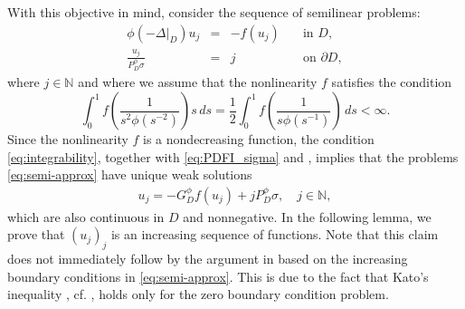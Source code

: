 \documentclass[12pt,a4paper,onecolumn]{amsart}
\theoremstyle{definition}
\newcommand{\N}{\mathbb{N}}
\newcommand{\1}{\mathbf 1}
\newcommand{\Lo}{\phi(-\left.\Delta\right\vert_{D})}
\newcommand{\GDfi}{G^\phi_{ D}}
\newcommand{\GDFI}{\GDfi}
\newcommand{\PDfi}{P^\phi_{ D}}
\newcommand{\PDFI}{\PDfi}
\numberwithin{equation}{section}
\begin{document}
With this objective in mind, consider the sequence of semilinear problems:
\begin{equation}\label{eq:semi-approx}
	\begin{array}{rcll}
		\Lo u_j&=& - f(u_j)& \quad \text{in } D,\\
		\frac{u_j}{\PDFI\sigma}&=&j&\quad \text{on }\partial D,
	\end{array}
\end{equation}
where $j\in \N$ and where we assume that the nonlinearity $f$ satisfies the condition 
\begin{equation}\label{eq:integrability}
    \int_0^1 f\left(\frac{1}{s^2\phi(s^{-2})}\right)s\, ds=\frac 1 2 \int_0^1 f\left(\frac{1}{s\phi(s^{-1})}\right)\, ds<\infty.
\end{equation}
Since the nonlinearity $f$ is a nondecreasing function, the condition \eqref{eq:integrability}, together with \eqref{eq:PDFI_sigma} and \cite[Theorem 5.10]{Bio23}, implies that the problems \eqref{eq:semi-approx} have unique weak solutions
\begin{align*}
	u_j=-\GDFI f(u_j)+j\PDFI\sigma,\quad j\in \N,
\end{align*}
which are also continuous in $D$ and nonnegative. In the following lemma, we prove that $(u_j)_j$ is an increasing sequence of functions. Note that this claim does not immediately follow by the argument in \cite[Chapter 7]{AbaDupaNonhomo2017} based on the increasing boundary conditions in \eqref{eq:semi-approx}.  This is due to the fact that Kato's inequality \cite[Proposition 5.4]{Bio23}, cf. \cite[Lemma 29]{AbaDupaNonhomo2017}, holds only for the zero boundary condition problem.
\end{document}
